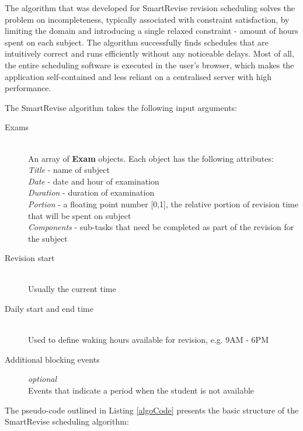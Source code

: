 \documentclass[bsc,frontabs,twoside,singlespacing,parskip]{infthesis}     %
\begin{document}
		The algorithm that was developed for SmartRevise revision scheduling solves the problem on incompleteness, typically associated with constraint satisfaction, by limiting the domain and introducing a single relaxed constraint - amount of hours spent on each subject. The algorithm successfully finds schedules that are intuitively correct and runs efficiently without any noticeable delays. Most of all, the entire scheduling software is executed in the user's browser, which makes the application self-contained and less reliant on a centralised server with high performance.

		The SmartRevise algorithm takes the following input arguments:

		\begin{description}
			\item[Exams] \hfill \\
				An array of \textbf{Exam} objects. Each object has the following attributes: \\
				\textit{Title} - name of subject\\
				\textit{Date} - date and hour of examination\\
				\textit{Duration} - duration of examination\\
				\textit{Portion} - a floating point number [0,1], the relative portion of revision time that will be spent on subject\\
				\textit{Components} - sub-tasks that need be completed as part of the revision for the subject
			\item[Revision start] \hfill \\
				Usually the current time
			\item[Daily start and end time] \hfill \\
				Used to define waking hours available for revision, e.g. 9AM - 6PM
			\item[Additional blocking events] \textit{optional} \hfill \\
				Events that indicate a period when the student is not available
		\end{description}

		The pseudo-code outlined in Listing \ref{algoCode} presents the basic structure of the SmartRevise scheduling algorithm:
\end{document}
